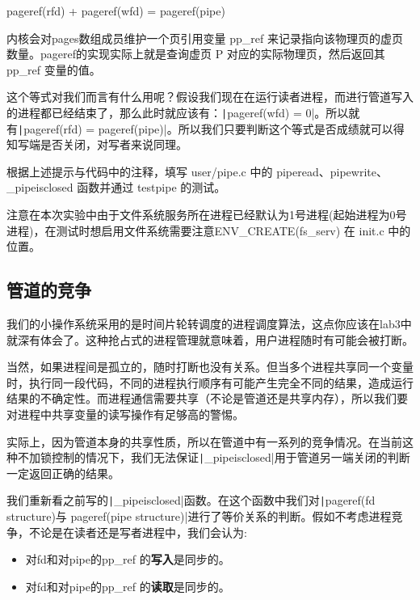 pageref(rfd) + pageref(wfd) = pageref(pipe)\label{variant}

\begin{note}
内核会对pages数组成员维护一个页引用变量 pp\_ref 来记录指向该物理页的虚页数量。pageref的实现实际上就是查询虚页 P 对应的实际物理页，然后返回其 pp\_ref 变量的值。
\end{note}

这个等式对我们而言有什么用呢？假设我们现在在运行读者进程，而进行管道写入的进程都已经结束了，那么此时就应该有：\texttt|pageref(wfd) = 0|。所以就有\texttt|pageref(rfd) = pageref(pipe)|。所以我们只要判断这个等式是否成绩就可以得知写端是否关闭，对写者来说同理。

\begin{exercise}
	根据上述提示与代码中的注释，填写 user/pipe.c 中的 piperead、pipewrite、\_pipeisclosed 函数并通过 testpipe 的测试。
\end{exercise}

\begin{note}
注意在本次实验中由于文件系统服务所在进程已经默认为1号进程(起始进程为0号进程)，在测试时想启用文件系统需要注意ENV\_CREATE(fs\_serv) 在 init.c 中的位置。
\end{note}

\subsection{管道的竞争}

我们的小操作系统采用的是时间片轮转调度的进程调度算法，这点你应该在lab3中就深有体会了。这种抢占式的进程管理就意味着，用户进程随时有可能会被打断。

当然，如果进程间是孤立的，随时打断也没有关系。但当多个进程共享同一个变量时，执行同一段代码，不同的进程执行顺序有可能产生完全不同的结果，造成运行结果的不确定性。而进程通信需要共享（不论是管道还是共享内存），所以我们要对进程中共享变量的读写操作有足够高的警惕。

实际上，因为管道本身的共享性质，所以在管道中有一系列的竞争情况。在当前这种不加锁控制的情况下，我们无法保证\texttt|_pipeisclosed|用于管道另一端关闭的判断一定返回正确的结果。

我们重新看之前写的\texttt|_pipeisclosed|函数。在这个函数中我们对\texttt|pageref(fd structure)与 pageref(pipe structure)|进行了等价关系的判断。假如不考虑进程竞争，不论是在读者还是写者进程中，我们会认为:

\begin{itemize}
	\item 对fd和对pipe的pp\_ref 的\textbf{写入}是同步的。
	\item 对fd和对pipe的pp\_ref 的\textbf{读取}是同步的。 
\end{itemize}

